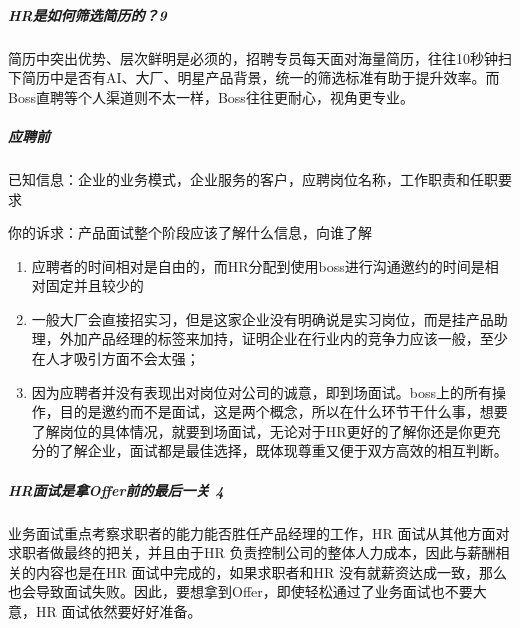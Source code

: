 \documentclass[letterpaper,10pt,english]{sphinxmanual}
\begin{document}
\subparagraph{HR是如何筛选简历的？9\sphinxfootnotemark[887]}
\label{\detokenize{chapter_interview/HR:hr-9}}%
\begin{footnotetext}[887]\sphinxAtStartFootnote
{}
%
\end{footnotetext}\ignorespaces 
简历中突出优势、层次鲜明是必须的，招聘专员每天面对海量简历，往往10秒钟扫下简历中是否有AI、大厂、明星产品背景，统一的筛选标准有助于提升效率。而Boss直聘等个人渠道则不太一样，Boss往往更耐心，视角更专业。


\subparagraph{应聘前}
\label{\detokenize{chapter_interview/HR:id1}}
已知信息：企业的业务模式，企业服务的客户，应聘岗位名称，工作职责和任职要求

你的诉求：产品面试整个阶段应该了解什么信息，向谁了解
\begin{enumerate}
%
\item {} 
应聘者的时间相对是自由的，而HR分配到使用boss进行沟通邀约的时间是相对固定并且较少的
%
\begin{footnote}[888]\sphinxAtStartFootnote
{}
%
\end{footnote}

\item {} 
一般大厂会直接招实习，但是这家企业没有明确说是实习岗位，而是挂产品助理，外加产品经理的标签来加持，证明企业在行业内的竞争力应该一般，至少在人才吸引方面不会太强；

\item {} 
因为应聘者并没有表现出对岗位对公司的诚意，即到场面试。boss上的所有操作，目的是邀约而不是面试，这是两个概念，所以在什么环节干什么事，想要了解岗位的具体情况，就要到场面试，无论对于HR更好的了解你还是你更充分的了解企业，面试都是最佳选择，既体现尊重又便于双方高效的相互判断。

\end{enumerate}


\subparagraph{HR面试是拿Offer前的最后一关 4\sphinxfootnotemark[889]}
\label{\detokenize{chapter_interview/HR:hroffer-4}}%
\begin{footnotetext}[889]\sphinxAtStartFootnote
{}
%
\end{footnotetext}\ignorespaces 
业务面试重点考察求职者的能力能否胜任产品经理的工作，HR
面试从其他方面对求职者做最终的把关，并且由于HR
负责控制公司的整体人力成本，因此与薪酬相关的内容也是在HR
面试中完成的，如果求职者和HR
没有就薪资达成一致，那么也会导致面试失败。因此，要想拿到Offer，即使轻松通过了业务面试也不要大意，HR
面试依然要好好准备。
\end{document}
